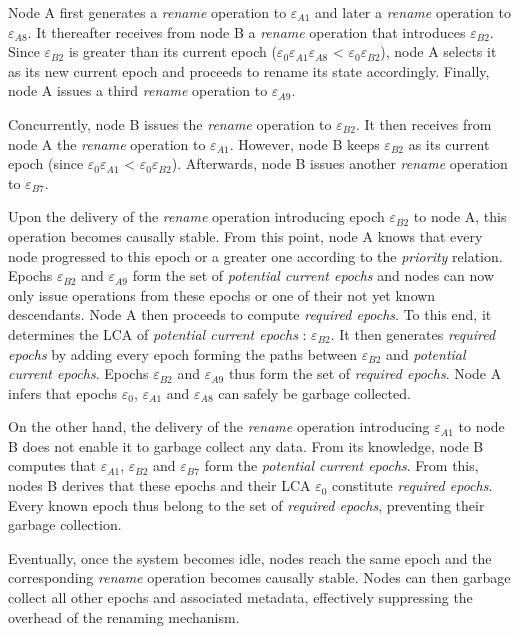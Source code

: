 \documentclass[10pt,journal,compsoc]{IEEEtran}
\newcommand{\epoch}[1]{$\varepsilon_{#1}$}
\begin{document}
Node A first generates a \emph{rename} operation to \epoch{A1} and later a \emph{rename} operation to \epoch{A8}.
It thereafter receives from node B a \emph{rename} operation that introduces \epoch{B2}.
Since \epoch{B2} is greater than its current epoch (\epoch{0}\epoch{A1}\epoch{A8} < \epoch{0}\epoch{B2}), node A selects it as its new current epoch and proceeds to rename its state accordingly.
Finally, node A issues a third \emph{rename} operation to \epoch{A9}.

Concurrently, node B issues the \emph{rename} operation to \epoch{B2}.
It then receives from node A the \emph{rename} operation to \epoch{A1}.
However, node B keeps \epoch{B2} as its current epoch (since \epoch{0}\epoch{A1} < \epoch{0}\epoch{B2}).
Afterwards, node B issues another \emph{rename} operation to \epoch{B7}.

Upon the delivery of the \emph{rename} operation introducing epoch \epoch{B2} to node A, this operation becomes causally stable.
From this point, node A knows that every node progressed to this epoch or a greater one according to the \emph{priority} relation.
Epochs \epoch{B2} and \epoch{A9} form the set of \emph{potential current epochs} and nodes can now only issue operations from these epochs or one of their not yet known descendants.
Node A then proceeds to compute \emph{required epochs}.
To this end, it determines the \ac{LCA} of \emph{potential current epochs} : \epoch{B2}.
It then generates \emph{required epochs} by adding every epoch forming the paths between \epoch{B2} and \emph{potential current epochs}.
Epochs \epoch{B2} and \epoch{A9} thus form the set of \emph{required epochs}.
Node A infers that epochs \epoch{0}, \epoch{A1} and \epoch{A8} can safely be garbage collected.

On the other hand, the delivery of the \emph{rename} operation introducing \epoch{A1} to node B does not enable it to garbage collect any data.
From its knowledge, node B computes that \epoch{A1}, \epoch{B2} and \epoch{B7} form the \emph{potential current epochs}.
From this, nodes B derives that these epochs and their \ac{LCA} \epoch{0} constitute \emph{required epochs}.
Every known epoch thus belong to the set of \emph{required epochs}, preventing their garbage collection.

Eventually, once the system becomes idle, nodes reach the same epoch and the corresponding \emph{rename} operation becomes causally stable.
Nodes can then garbage collect all other epochs and associated metadata, effectively suppressing the overhead of the renaming mechanism.
\end{document}
